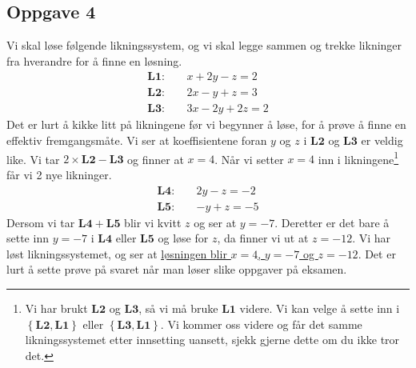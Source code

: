 \documentclass[12pt, a4paper]
{article}						%
\def\answer#1{\underline{\underline{#1}}}
\begin{document}
\subsection*{Oppgave 4}
Vi skal løse følgende likningssystem, og vi skal legge sammen og trekke likninger fra hverandre for å finne en løsning.
\begin{align*}
	\mathbf{L1: }\quad &x + 2y - z = 2\\
	\mathbf{L2: }\quad &2x - y + z = 3 \\
	\mathbf{L3: }\quad &3x - 2y + 2z = 2
\end{align*}
Det er lurt å kikke litt på likningene før vi begynner å løse, for å prøve å finne en effektiv fremgangsmåte.
Vi ser at koeffisientene foran $y$ og $z$ i $\mathbf{L2}$ og $\mathbf{L3}$ er veldig like.
Vi tar $2 \times \mathbf{L2} - \mathbf{L3}$ og finner at $x = 4$. 
Når vi setter $x = 4$ inn i likningene\footnote{Vi har brukt $\mathbf{L2}$ og $\mathbf{L3}$, så vi må bruke $\mathbf{L1}$ videre. Vi kan velge å sette inn i  $\left\{\mathbf{L2}, \mathbf{L1}\right\}$ eller $\left\{\mathbf{L3}, \mathbf{L1}\right\}$. Vi kommer oss videre og får det samme likningssystemet etter innsetting uansett, sjekk gjerne dette om du ikke tror det.} får vi 2 nye likninger.
\begin{align*}
\mathbf{L4: }\quad &2y - z = -2\\
\mathbf{L5: }\quad &- y + z = -5
\end{align*}
Dersom vi tar $\mathbf{L4} + \mathbf{L5}$ blir vi kvitt $z$ og ser at $y = -7$.
Deretter er det bare å sette inn $y = -7$ i $\mathbf{L4}$ eller $\mathbf{L5}$ og løse for $z$,
da finner vi ut at $z = -12$. Vi har løst likningssystemet, og ser at \answer{løsningen blir $x = 4$, $y = -7$ og $z = -12$}. Det er lurt å sette prøve på svaret når man løser slike oppgaver på eksamen.
\end{document}
